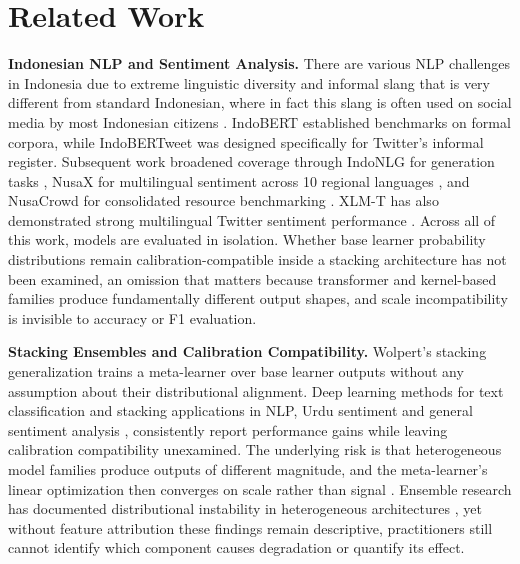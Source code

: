 \documentclass[conference]{IEEEtran}
\begin{document}
\section{Related Work}

\textbf{Indonesian NLP and Sentiment Analysis.}
There are various NLP challenges in Indonesia due to extreme linguistic diversity and informal slang that is very different from standard Indonesian, where in fact this slang is often used on social media by most Indonesian citizens \cite{b5}. IndoBERT \cite{b3} established benchmarks on formal corpora, while IndoBERTweet \cite{b4} was designed specifically for Twitter's informal register. Subsequent work broadened coverage through IndoNLG for generation tasks \cite{b2}, NusaX for multilingual sentiment across 10 regional languages \cite{b6}, and NusaCrowd for consolidated resource benchmarking \cite{b19}. XLM-T has also demonstrated strong multilingual Twitter sentiment performance \cite{b29}. Across all of this work, models are evaluated in isolation. Whether base learner probability distributions remain calibration-compatible inside a stacking architecture has not been examined, an omission that matters because transformer and kernel-based families produce fundamentally different output shapes, and scale incompatibility is invisible to accuracy or F1 evaluation.

\textbf{Stacking Ensembles and Calibration Compatibility.}
Wolpert's stacking generalization \cite{b7} trains a meta-learner over base learner outputs without any assumption about their distributional alignment. Deep learning methods for text classification \cite{b9} and stacking applications in NLP, Urdu sentiment \cite{b8} and general sentiment analysis \cite{b10}, consistently report performance gains while leaving calibration compatibility unexamined. The underlying risk is that heterogeneous model families produce outputs of different magnitude, and the meta-learner's linear optimization then converges on scale rather than signal \cite{b17}. Ensemble research has documented distributional instability in heterogeneous architectures \cite{b22}, yet without feature attribution these findings remain descriptive, practitioners still cannot identify which component causes degradation or quantify its effect.
\end{document}
